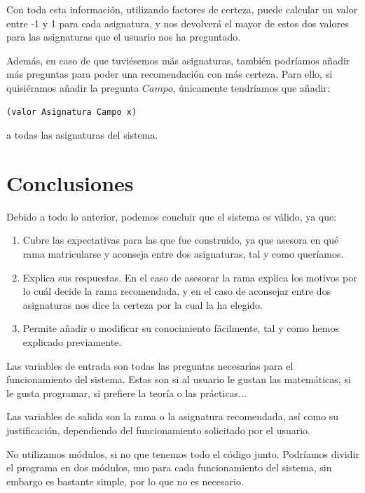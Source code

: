 \documentclass[11pt,a4paper]{article}
\begin{document}
Con toda esta información, utilizando factores de certeza, puede calcular un valor entre -1 y 1 para cada asignatura, y nos devolverá el mayor de estos dos valores para las asignaturas que el usuario nos ha preguntado.

Además, en caso de que tuviésemos más asignaturas, también podríamos añadir más preguntas para poder una recomendación con más certeza. Para ello, si quisiéramos añadir la pregunta $Campo$, únicamente tendríamos que añadir:
\begin{lstlisting}
(valor Asignatura Campo x)
\end{lstlisting}
a todas las asignaturas del sistema.

\section{Conclusiones}

Debido a todo lo anterior, podemos concluir que el sistema es válido, ya que:

\begin{enumerate}[label = \arabic*]
\item Cubre las expectativas para las que fue construido, ya que asesora en qué rama matricularse y aconseja entre dos asignaturas, tal y como queríamos.
\item Explica sus respuestas. En el caso de asesorar la rama explica los motivos por lo cuál decide la rama recomendada, y en el caso de aconsejar entre dos asignaturas nos dice la certeza por la cual la ha elegido.
\item Permite añadir o modificar su conocimiento fácilmente, tal y como hemos explicado previamente.
\end{enumerate}

Las variables de entrada son todas las preguntas necesarias para el funcionamiento del sistema. Estas son si al usuario le gustan las matemáticas, si le gusta programar, si prefiere la teoría o las prácticas...

Las variables de salida son la rama o la asignatura recomendada, así como su justificación, dependiendo del funcionamiento solicitado por el usuario.

No utilizamos módulos, si no que tenemos todo el código junto. Podríamos dividir el programa en dos módulos, uno para cada funcionamiento del sistema, sin embargo es bastante simple, por lo que no es necesario.
\end{document}

